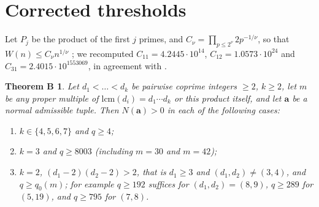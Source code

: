 \documentclass[11pt,a4paper]{amsart}
\newtheorem*{theoremB}{Theorem B}
\theoremstyle{remark}
\newcommand{\lcm}{\mathrm{lcm}}
\newcommand{\ba}{\mathbf{a}}
\begin{document}
\section{Corrected thresholds}

Let $P_j$ be the product of the first $j$ primes, and $C_\nu=\prod_{p\le2^\nu}2p^{-1/\nu}$, so that
$W(n)\le C_\nu n^{1/\nu}$ \cite{CH2}; we recomputed $C_{11}=4.2445\cdot10^{14}$,
$C_{12}=1.0573\cdot10^{24}$ and $C_{31}=2.4015\cdot10^{1553069}$, in agreement with \cite[Lemma~2.7]{MKB}.

\begin{theoremB}
Let $d_1<\dots<d_k$ be pairwise coprime integers $\ge2$, $k\ge2$, let $m$ be any proper multiple of
$\lcm(d_i)=d_1\cdots d_k$ or this product itself, and let $\ba$ be a normal admissible tuple. Then
$N(\ba)>0$ in each of the following cases:
\begin{enumerate}
\item[(i)] $k\in\{4,5,6,7\}$ and $q\ge4$;
\item[(ii)] $k=3$ and $q\ge8003$ (including $m=30$ and $m=42$);
\item[(iii)] $k=2$, $(d_1-2)(d_2-2)>2$, that is $d_1\ge3$ and $(d_1,d_2)\ne(3,4)$, and $q\ge q_0(m)$; for
example $q\ge192$ suffices for $(d_1,d_2)=(8,9)$, $q\ge289$ for $(5,19)$, and $q\ge795$ for $(7,8)$.
\end{enumerate}
\end{theoremB}
\end{document}
